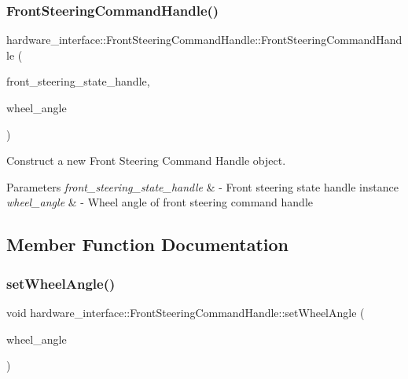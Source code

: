 \subsubsection{\texorpdfstring{Front\+Steering\+Command\+Handle()}{FrontSteeringCommandHandle()}}
{\footnotesize\ttfamily hardware\+\_\+interface\+::\+Front\+Steering\+Command\+Handle\+::\+Front\+Steering\+Command\+Handle (\begin{DoxyParamCaption}\item[{const \hyperlink{classhardware__interface_1_1FrontSteeringStateHandle}{Front\+Steering\+State\+Handle} \&}]{front\+\_\+steering\+\_\+state\+\_\+handle,  }\item[{double $\ast$}]{wheel\+\_\+angle }\end{DoxyParamCaption})\hspace{0.3cm}{\ttfamily [inline]}}



Construct a new Front Steering Command Handle object. 


\begin{DoxyParams}{Parameters}
{\em front\+\_\+steering\+\_\+state\+\_\+handle} & -\/ Front steering state handle instance \\
\hline
{\em wheel\+\_\+angle} & -\/ Wheel angle of front steering command handle \\
\hline
\end{DoxyParams}


\subsection{Member Function Documentation}
\mbox{\label{classhardware__interface_1_1FrontSteeringCommandHandle_acd5e7d29e7fe2992244c1cfcda28cede}} 
\subsubsection{\texorpdfstring{set\+Wheel\+Angle()}{setWheelAngle()}}
{\footnotesize\ttfamily void hardware\+\_\+interface\+::\+Front\+Steering\+Command\+Handle\+::set\+Wheel\+Angle (\begin{DoxyParamCaption}\item[{double}]{wheel\+\_\+angle }\end{DoxyParamCaption})\hspace{0.3cm}{\ttfamily [inline]}}



